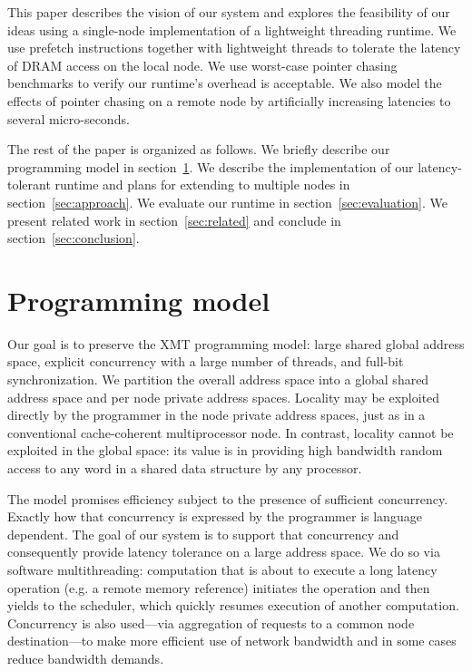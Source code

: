 \documentclass[10pt,nocopyrightspace,preprint]{sigplanconf}
\begin{document}
This paper describes the vision of our system and explores the
feasibility of our ideas using a single-node implementation of a
lightweight threading runtime. We use prefetch instructions together
with lightweight threads to tolerate the latency of DRAM access on the
local node. We use worst-case pointer chasing benchmarks to
verify our runtime's overhead is acceptable. We also model the effects
of pointer chasing on a remote node by artificially increasing
latencies to several micro-seconds.
 
The rest of the paper is organized as follows. We briefly describe our
programming model in section~\ref{sec:model}. We describe the
implementation of our latency-tolerant runtime and plans for extending
to multiple nodes in section~\ref{sec:approach}. We evaluate our
runtime in section~\ref{sec:evaluation}.  We present related work in
section~\ref{sec:related} and conclude in
section~\ref{sec:conclusion}.


\section{Programming model}
\label{sec:model}

Our goal is to preserve the XMT programming model: large shared global
address space, explicit concurrency with a large number of threads,
and full-bit synchronization.  We partition the overall address
space into a global shared address space and per node private address
spaces. Locality may be exploited directly by the programmer in the
node private address spaces, just as in a conventional cache-coherent
multiprocessor node. In contrast, locality cannot be exploited in the
global space: its value is in providing high bandwidth random access
to any word in a shared data structure by any processor.



The model promises efficiency subject to the presence of sufficient
concurrency.  Exactly how that concurrency is expressed by the
programmer is language dependent. The goal of our system is to support
that concurrency and consequently provide latency tolerance on a large
address space. We do so via software multithreading: computation that
is about to execute a long latency operation (e.g. a remote memory
reference) initiates the operation and then yields to the scheduler,
which quickly resumes execution of another computation.  Concurrency
is also used---via aggregation of requests to a common node
destination---to make more efficient use of network bandwidth and in
some cases reduce bandwidth demands.
\end{document}
